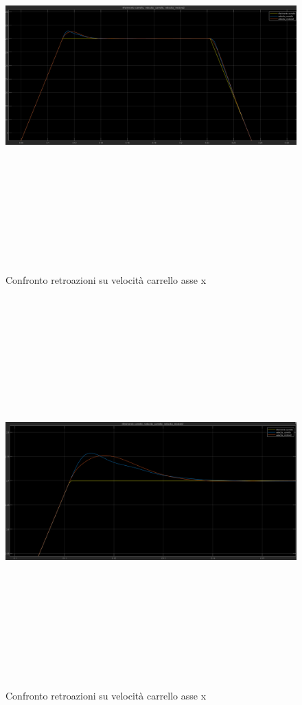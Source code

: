 \documentclass{article}
\begin{document}
\begin{figure}[H]
\centering
\includegraphics[width=13cm,height=15cm,keepaspectratio]{./simulink/ldm_variabile/PIDX_VELOCITA1}
\caption{Confronto retroazioni su velocità carrello asse x}
\end{figure}

\begin{figure}[H]
\centering
\includegraphics[width=13cm,height=15cm,keepaspectratio]{./simulink/ldm_variabile/PIDX_VELOCITA1ZOOM}
\caption{Confronto retroazioni su velocità carrello asse x}
\end{figure}
\end{document}

